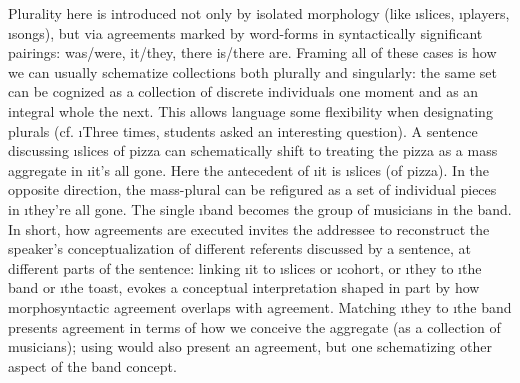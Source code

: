 {Plurality here is introduced not only by isolated morphology (like \i{slices},
\i{players}, \i{songs}), but via agreements marked by
word-forms in syntactically significant pairings: was/were, it/they,
there is/there are. \> Framing all of these cases is how we can usually schematize
collections both plurally and singularly: the same set can be cognized as a
collection of discrete individuals one moment and as an integral whole the next.
\> This allows language some flexibility when designating plurals
(cf. \i{Three times, students asked an interesting question}). \> A sentence
discussing \i{slices of pizza} can schematically shift to treating
the pizza as a mass aggregate in \i{it's all gone}. \> Here the antecedent
of \i{it} is \i{slices} (of pizza). \> In the opposite direction, the mass-plural
 can be refigured as a set of individual pieces in \i{they're all gone}.
\> The single \i{band} becomes the group of musicians in the band.
\> In short, how agreements are executed invites the addressee to reconstruct
the speaker's conceptualization of different referents discussed by
a sentence, at different parts of the sentence: linking
\i{it} to \i{slices} or \i{cohort}, or \i{they} to \i{the band} or
\i{the toast}, evokes a conceptual interpretation shaped in
part by how morphosyntactic agreement overlaps with 
agreement. \> Matching \i{they} to \i{the band} presents agreement
in terms of how we conceive the aggregate (as a collection of
musicians); using  would also present an agreement, but
one schematizing other aspect of the band concept.\;\<
}


